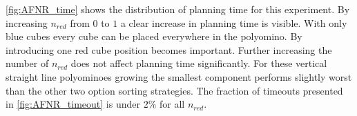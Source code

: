 \autoref{fig:AFNR_time} shows the distribution of planning time for this experiment.
By increasing $n_\textit{red}$ from $0$ to $1$ a clear increase in planning time is visible.
With only blue cubes every cube can be placed everywhere in the polyomino.
By introducing one red cube position becomes important.
Further increasing the number of $n_\textit{red}$ does not affect planning time significantly.
For these vertical straight line polyominoes growing the smallest component performs slightly worst than the other two option sorting strategies.
The fraction of timeouts presented in \autoref{fig:AFNR_timeout} is under $2\%$ for all $n_\textit{red}$. 



